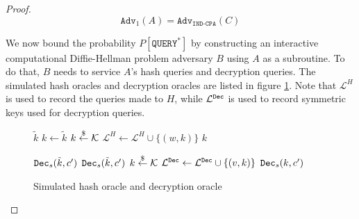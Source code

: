 \documentclass{article}
\begin{document}
\begin{proof}
    \begin{equation*}
        \texttt{Adv}_1(A) = \texttt{Adv}_\texttt{IND-CPA}(C)
    \end{equation*}

    We now bound the probability $P\left\lbrack \texttt{QUERY}^\ast \right\rbrack$ by constructing an interactive computational Diffie-Hellman problem adversary $B$ using $A$ as a subroutine. To do that, $B$ needs to service $A$'s hash queries and decryption queries. The simulated hash oracles and decryption oracles are listed in figure \ref{fig:sim-oracles}. Note that $\mathcal{L}^H$ is used to record the queries made to $H$, while $\mathcal{L}^{\texttt{Dec}}$ is used to record symmetric keys used for decryption queries.
    
    \begin{figure}[H]
        \begin{minipage}{0.5\textwidth}
            \begin{algorithm}[H]
                \caption{$\mathcal{O}^H_1(w)$}
                \begin{algorithmic}[1]
                        \State \Return $\tilde{k}$
                        \State $k \leftarrow \tilde{k}$
                    \Else
                        \State $k \stackrel{\$}{\leftarrow} \mathcal{K}$
                    \EndIf
                    \State $\mathcal{L}^H \leftarrow \mathcal{L}^H \cup \{(w, k)\}$
                    \State \Return $k$
                \end{algorithmic}
            \end{algorithm}
        \end{minipage}
        \begin{minipage}{0.49\textwidth}
            \begin{algorithm}[H]
                \caption{$\mathcal{O}^\decrypt_1(v, c^\prime)$}
                \begin{algorithmic}[1]
                        \State \Return $\texttt{Dec}_s(\tilde{k}, c^\prime)$
                        \State \Return $\texttt{Dec}_s(\tilde{k}, c^\prime)$
                    \Else
                        \State $k \stackrel{\$}{\leftarrow} \mathcal{K}$
                        \State $\mathcal{L}^{\texttt{Dec}} \leftarrow \mathcal{L}^{\texttt{Dec}} \cup \{(v, k)\}$
                        \State \Return $\texttt{Dec}_s(k, c^\prime)$
                    \EndIf
                \end{algorithmic}
            \end{algorithm}
        \end{minipage}
        \caption{Simulated hash oracle and decryption oracle}\label{fig:sim-oracles}
    \end{figure}


\end{proof}
\end{document}
